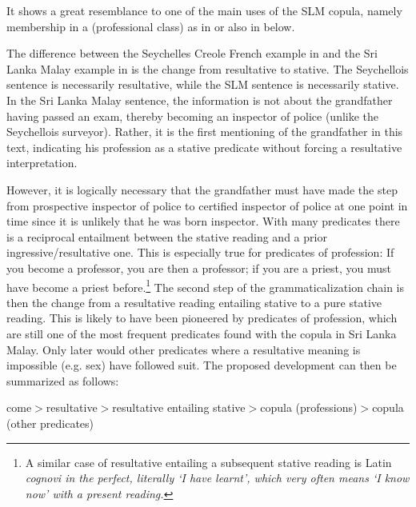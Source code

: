 \documentclass[a4paper,12pt]{article}
\begin{document}
It shows a great resemblance to one of the main uses of the SLM copula, namely membership in a (professional class) as in  or also in  below.


The difference between   the Seychelles Creole French example in  and the Sri Lanka Malay example in  is the change from resultative to stative. The Seychellois sentence is necessarily resultative, while the SLM sentence is necessarily stative. In the Sri Lanka Malay sentence, the information is not about the grandfather having passed an exam, thereby becoming an inspector of police (unlike the Seychellois surveyor). Rather, it is the first mentioning of the grandfather in this text, indicating his profession as a stative predicate without forcing a resultative interpretation.

However, it is logically necessary that the grandfather must have made the step from prospective inspector of police to certified inspector of police at one point in time since it is unlikely that he was born inspector. With many predicates there is a reciprocal entailment between the stative reading and a prior ingressive/resultative one. This is especially true for predicates of profession: If you become a professor, you are then a professor; if you are a priest, you must have become a priest before.\footnote{A similar case of resultative entailing a subsequent stative reading is Latin \em cognovi \em in the perfect, literally `I have learnt', which very often means `I know now' with a present reading.} The second step of the grammaticalization chain is then the change from a resultative reading entailing stative to a pure stative reading. This is likely to have been pioneered by predicates of profession, which are still one of the most frequent predicates found with the copula in Sri Lanka Malay. Only later would other predicates where a resultative meaning is impossible (e.g. sex) have followed suit. The proposed development can then be summarized as follows:

\small
\ea come$>$resultative$>$resultative entailing stative$>$copula (professions)$>$copula (other predicates)\z
\normalsize
 
\end{document}
